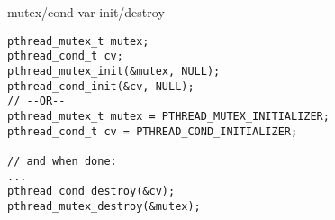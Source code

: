 \begin{frame}[fragile,label=createMonitors]{mutex/cond var init/destroy}
\begin{lstlisting}[style=smaller]
pthread_mutex_t mutex;
pthread_cond_t cv;
pthread_mutex_init(&mutex, NULL);
pthread_cond_init(&cv, NULL);
// --OR--
pthread_mutex_t mutex = PTHREAD_MUTEX_INITIALIZER;
pthread_cond_t cv = PTHREAD_COND_INITIALIZER;

// and when done:
...
pthread_cond_destroy(&cv);
pthread_mutex_destroy(&mutex);
\end{lstlisting}
\end{frame}

